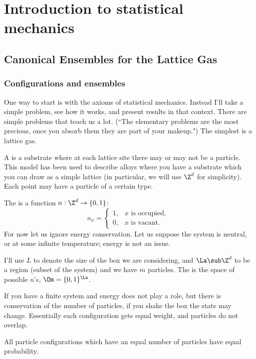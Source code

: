\chapter{Introduction to statistical mechanics}


\section{Canonical Ensembles for the Lattice Gas}
\subsection{Configurations and ensembles}
One way to start is with the axioms of statistical mechanics. Instead I'll take a simple problem, see how it works, and present results in that context. There are simple problems that teach us a lot. (``The elementary problems are the most precious, once you absorb them they are part of your makeup.") The simplest is a lattice gas.

\begin{df}
A  is a substrate where at each lattice site there may or may not be a particle. This model has been used to describe alloys where you have a substrate which you can draw as a simple lattice (in particular, we will use $\Z^d$ for simplicity). Each point may have a particle of a certain type.

The  is a function $n:\Z^d\to \{0,1\}$:
\[
n_x=\begin{cases}
1,&\text{$x$ is occupied},\\
0,&\text{$x$ is vacant}.
\end{cases}
\]
For now let us ignore energy conservation. Let us suppose the system is neutral, or at some infinite temperature; energy is not an issue. 

I'll use $L$ to denote the size of the box we are considering, and $\La\sub \Z^d$ to be a region (subset of the system) and we have $m$ particles. The  is the space of possible $n$'s, $\Om = \{0,1\}^{\La}$.

If you have a finite system and energy does not play a role, but there is conservation of the number of particles, if you shake the box the state may change. Essentially each configuration gets equal weight, and particles do not overlap. 
\end{df}


\begin{df}
All particle configurations which have an equal number of particles have equal probability.
\end{df}

